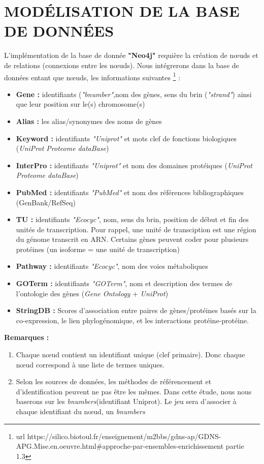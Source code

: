 \documentclass[a4paper,11pt,openright]{report}
\begin{document}
	\section{MODÉLISATION DE LA BASE DE DONNÉES}
L'implémentation de la base de donnée \textbf{"Neo4j"} requière la création de nœuds et de relations (connexions entre les nœuds).  Nous intégrerons dans la base de données entant que nœuds, les informations suivantes  \footnote{url {https://silico.biotoul.fr/enseignement/m2bbs/gdns-ap/GDNS-APG.Mise.en.oeuvre.html$\#$approche-par-ensembles-enrichissement} partie 1.3} :
\begin{itemize}
	\item \textbf{Gene : } identifiants (\textit{"bnumber"},nom des gènes, sens du brin (\textit{"strand"}) ainsi que leur position sur le(s) chromosome(s)
	\item \textbf{Alias : } les alias/synonymes des noms de gènes
    \item \textbf{Keyword : }  identifiants \textit{"Uniprot"} et mots clef de fonctions biologiques (\textit{UniProt Proteome dataBase})
    \item \textbf{InterPro : } identifiants \textit{"Uniprot"} et nom des domaines protéiques (\textit{UniProt Proteome dataBase})
    \item \textbf{PubMed : } identifiants \textit{"PubMed"} et nom des références bibliographiques (GenBank/RefSeq) 
    \item \textbf{TU : } identifiants \textit{"Ecocyc"}, nom, sens du brin, position de début et fin des unités de transcription. Pour rappel, une unité de transciption est une région du génome transcrit en ARN. Certains gènes peuvent coder pour plusieurs protéines (un isoforme = une unité de transcription)    
    \item \textbf{Pathway : } identifiants \textit{"Ecocyc"}, nom  des voies métaboliques 
    \item \textbf{GOTerm : } identifiants \textit{"GOTerm"}, nom  et description des termes de l’ontologie des gènes (\textit{Gene Ontology} + \textit{UniProt}) 
    \item \textbf{StringDB : } Scores d'association entre paires de gènes/protéines basés sur la co-expression, le lien phylogénomique, et les interactions protéine-protéine. 
\end{itemize}

\textbf{Remarques : } 
\begin{enumerate}
\item Chaque nœud contient un identifiant unique (clef primaire). Donc chaque nœud correspond à une liste de termes uniques.
\item Selon les sources de données, les méthodes de référencement et d’identification peuvent ne pas être les mêmes. Dans cette étude, nous nous baserons sur les \textit{bnumbers}(identifiant Uniprot). Le jeu sera d'associer à chaque identifiant du nœud, un \textit{bnumbers}
\end{enumerate}
\end{document}
